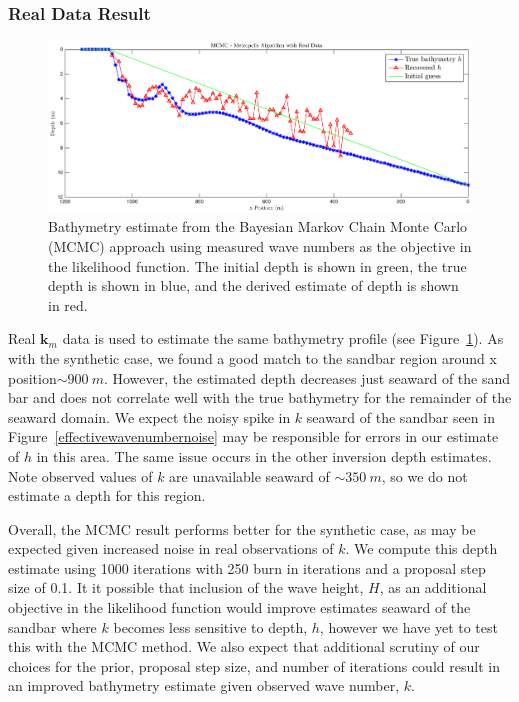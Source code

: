 \subsubsection{Real Data Result}
\begin{figure}[H]
\center
\includegraphics[scale=0.46]{img/MCMC-realdata-600.eps}
\caption{Bathymetry estimate from the Bayesian Markov Chain Monte Carlo (MCMC) approach using measured wave numbers as the objective in the likelihood function. The initial depth is shown in green, the true depth is shown in blue, and the derived estimate of depth is shown in red.}
\label{mcmc-real}
\end{figure}

Real $\mathbf{k}_m$ data is used to estimate the same bathymetry profile (see Figure~\ref{mcmc-real}). As with the synthetic case, we found a good match to the sandbar region around x position$\sim900~m$. However, the estimated depth decreases just seaward of the sand bar and does not correlate well with the true bathymetry for the remainder of the seaward domain. We expect the noisy spike in $k$ seaward of the sandbar seen in  Figure~\ref{effectivewavenumbernoise} may be responsible for errors in our estimate of $h$ in this area. The same issue occurs in the other inversion depth estimates. Note observed values of $k$ are unavailable seaward of $\sim350~m$, so we do not estimate a depth for this region. 

Overall, the MCMC result performs better for the synthetic case, as may be expected given increased noise in real observations of $k$. We compute this depth estimate using 1000 iterations with 250 burn in iterations and a proposal step size of 0.1. It it possible that inclusion of the wave height, $H$, as an additional objective in the likelihood function would improve estimates seaward of the sandbar where $k$ becomes less sensitive to depth, $h$, however we have yet to test this with the MCMC method. We also expect that additional scrutiny of our choices for the prior, proposal step size, and number of iterations could result in an improved bathymetry estimate given observed wave number, $k$. 

